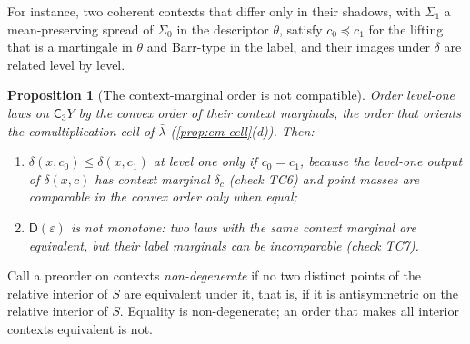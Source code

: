 \documentclass[11pt]{article}
\newtheorem{proposition}[theorem]{Proposition}
\theoremstyle{definition}
\newcommand{\D}{\mathsf D}
\newcommand{\C}{\mathsf C}
\newcommand{\lb}{\bar\lambda}
\begin{document}
For instance, two coherent contexts that differ only in their shadows, with $\Sigma_1$ a mean-preserving spread of $\Sigma_0$ in the
descriptor $\theta$, satisfy $c_0\preccurlyeq c_1$ for the lifting that is a martingale in $\theta$ and Barr-type in the label, and
their images under $\delta$ are related level by level.

\begin{proposition}[The context-marginal order is not compatible]\label{prop:ctx-marg}
Order level-one laws on $\C_3Y$ by the convex order of their context marginals, the order that orients the comultiplication cell of
$\lb$ (\cref{prop:cm-cell}(d)). Then:
\begin{enumerate}[label=(\alph*)]
\item $\delta(x,c_0)\le\delta(x,c_1)$ at level one only if $c_0=c_1$, because the level-one output of $\delta(x,c)$ has context marginal
  $\delta_c$ (check TC6) and point masses are comparable in the convex order only when equal;
\item $\D(\varepsilon)$ is not monotone: two laws with the same context marginal are equivalent, but their label marginals can be
  incomparable (check TC7).
\end{enumerate}
\end{proposition}

Call a preorder on contexts \emph{non-degenerate} if no two distinct points of the relative interior of $S$ are equivalent under it,
that is, if it is antisymmetric on the relative interior of $S$. Equality is non-degenerate; an order that makes all interior contexts
equivalent is not.
\end{document}
